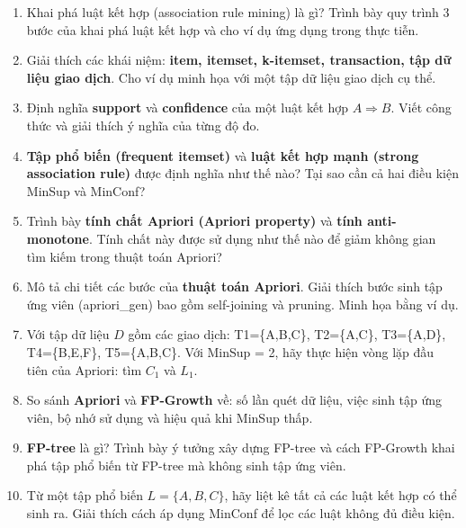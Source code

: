 \documentclass[10pt]{article}
\begin{document}
\begin{enumerate}[leftmargin=*, label=\textbf{Câu \arabic*.}]

    \item Khai phá luật kết hợp (association rule mining) là gì? Trình bày quy trình 3 bước của khai phá luật kết hợp và cho ví dụ ứng dụng trong thực tiễn.

    \item Giải thích các khái niệm: \textbf{item, itemset, k-itemset, transaction, tập dữ liệu giao dịch}. Cho ví dụ minh họa với một tập dữ liệu giao dịch cụ thể.

    \item Định nghĩa \textbf{support} và \textbf{confidence} của một luật kết hợp $A \Rightarrow B$. Viết công thức và giải thích ý nghĩa của từng độ đo.

    \item \textbf{Tập phổ biến (frequent itemset)} và \textbf{luật kết hợp mạnh (strong association rule)} được định nghĩa như thế nào? Tại sao cần cả hai điều kiện MinSup và MinConf?

    \item Trình bày \textbf{tính chất Apriori (Apriori property)} và \textbf{tính anti-monotone}. Tính chất này được sử dụng như thế nào để giảm không gian tìm kiếm trong thuật toán Apriori?

    \item Mô tả chi tiết các bước của \textbf{thuật toán Apriori}. Giải thích bước sinh tập ứng viên (apriori\_gen) bao gồm self-joining và pruning. Minh họa bằng ví dụ.

    \item Với tập dữ liệu $D$ gồm các giao dịch: T1=\{A,B,C\}, T2=\{A,C\}, T3=\{A,D\}, T4=\{B,E,F\}, T5=\{A,B,C\}. Với MinSup = 2, hãy thực hiện vòng lặp đầu tiên của Apriori: tìm $C_1$ và $L_1$.

    \item So sánh \textbf{Apriori} và \textbf{FP-Growth} về: số lần quét dữ liệu, việc sinh tập ứng viên, bộ nhớ sử dụng và hiệu quả khi MinSup thấp.

    \item \textbf{FP-tree} là gì? Trình bày ý tưởng xây dựng FP-tree và cách FP-Growth khai phá tập phổ biến từ FP-tree mà không sinh tập ứng viên.

    \item Từ một tập phổ biến $L = \{A, B, C\}$, hãy liệt kê tất cả các luật kết hợp có thể sinh ra. Giải thích cách áp dụng MinConf để lọc các luật không đủ điều kiện.


\end{enumerate}
\end{document}

